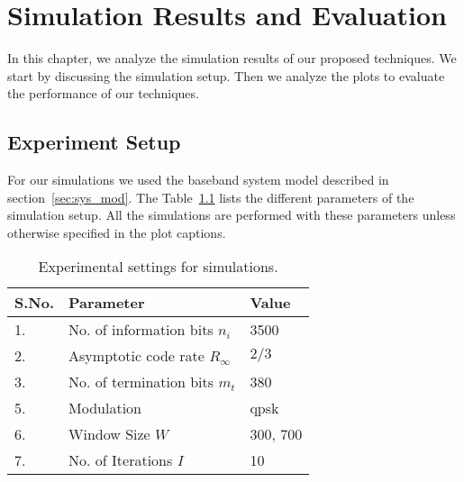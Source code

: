 \chapter{Simulation Results and Evaluation}\label{ch:simulation}
In this chapter, we analyze the simulation results of our proposed techniques. We start by discussing the simulation setup. Then we analyze the plots to evaluate the performance of our techniques.

\section{Experiment Setup}
For our simulations we used the baseband system model described in section~\ref{sec:sys_mod}. The Table~\ref{tab:sim_param} lists the different parameters of the simulation setup. All the simulations are performed with these parameters unless otherwise specified in the plot captions.
\begin{table}[htbp]
\centering
\begin{tabular}{|l|l|l|}
  \hline
  \textbf{S.No.} &\textbf{Parameter} &\textbf{Value}\\
  \hline
  \hline
  1. &No. of information bits $n_i$ &3500\\
  \hline
  2. &Asymptotic code rate $R_\infty$ &$2/3$\\
  \hline
  3. &No. of termination bits $m_t$ &380\\
  \hline
  5. &Modulation &\gls{qpsk}\\
  \hline
  6. &Window Size $W$ &300, 700\\
  \hline
  7. &No. of Iterations $I$ &10\\
  \hline
\end{tabular}
\caption{Experimental settings for simulations.}
\label{tab:sim_param}
\end{table}

